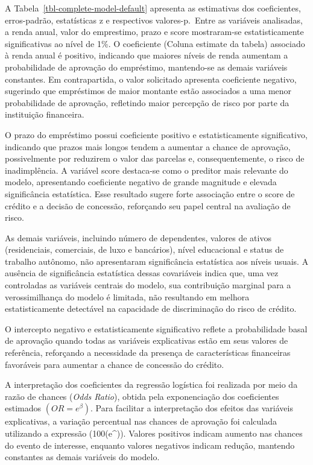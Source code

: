 \documentclass[
  brazilian,
  12pt,
  letterpaper,
  DIV=11,
  numbers=noendperiod]{scrartcl}
\begin{document}
A Tabela~\ref{tbl-complete-model-default} apresenta as estimativas dos
coeficientes, erros-padrão, estatísticas z e respectivos
valores-p.~Entre as variáveis analisadas, a renda anual, valor do
emprestimo, prazo e score mostraram-se estatisticamente significativas
ao nível de 1\%. O coeficiente (Coluna estimate da tabela) associado à
renda anual é positivo, indicando que maiores níveis de renda aumentam a
probabilidade de aprovação do empréstimo, mantendo-se as demais
variáveis constantes. Em contrapartida, o valor solicitado apresenta
coeficiente negativo, sugerindo que empréstimos de maior montante estão
associados a uma menor probabilidade de aprovação, refletindo maior
percepção de risco por parte da instituição financeira.

O prazo do empréstimo possui coeficiente positivo e estatisticamente
significativo, indicando que prazos mais longos tendem a aumentar a
chance de aprovação, possivelmente por reduzirem o valor das parcelas e,
consequentemente, o risco de inadimplência. A variável score destaca-se
como o preditor mais relevante do modelo, apresentando coeficiente
negativo de grande magnitude e elevada significância estatística. Esse
resultado sugere forte associação entre o score de crédito e a decisão
de concessão, reforçando seu papel central na avaliação de risco.

As demais variáveis, incluindo número de dependentes, valores de ativos
(residenciais, comerciais, de luxo e bancários), nível educacional e
status de trabalho autônomo, não apresentaram significância estatística
aos níveis usuais. A ausência de significância estatística dessas
covariáveis indica que, uma vez controladas as variáveis centrais do
modelo, sua contribuição marginal para a verossimilhança do modelo é
limitada, não resultando em melhora estatisticamente detectável na
capacidade de discriminação do risco de crédito.

O intercepto negativo e estatisticamente significativo reflete a
probabilidade basal de aprovação quando todas as variáveis explicativas
estão em seus valores de referência, reforçando a necessidade da
presença de características financeiras favoráveis para aumentar a
chance de concessão do crédito.

A interpretação dos coeficientes da regressão logística foi realizada
por meio da razão de chances (\emph{Odds Ratio}), obtida pela
exponenciação dos coeficientes estimados \((OR=e^\beta)\). Para
facilitar a interpretação dos efeitos das variáveis explicativas, a
variação percentual nas chances de aprovação foi calculada utilizando a
expressão (100(e\^{})). Valores positivos indicam aumento nas
chances do evento de interesse, enquanto valores negativos indicam
redução, mantendo constantes as demais variáveis do modelo.
\end{document}
